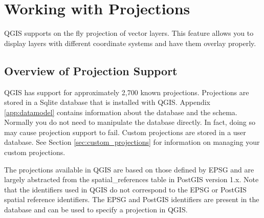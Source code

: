 \chapter{Working with Projections}
QGIS supports on the fly projection of vector layers. This feature allows you
to display layers with different coordinate systems and have them overlay
properly. 
\section{Overview of Projection Support}
QGIS has support for approximately 2,700 known projections. 
Projections are stored in a Sqlite database that is installed with QGIS.
Appendix \ref{app:datamodel}  contains information about the database and the
schema. Normally you do not need to manipulate the database directly. In fact,
doing so may cause projection support to fail. Custom projections are
stored in a user database. See Section \ref{sec:custom_projections} for
information on managing your custom projections.

The projections available in QGIS are based on those defined by EPSG and are
largely abstracted from the spatial\_references table in PostGIS version 1.x.
Note that the identifiers used in QGIS do not correspond to the EPSG or
PostGIS spatial reference identifiers. The EPSG and PostGIS identifiers are
present in the database and can be used to specify a projection in QGIS.

